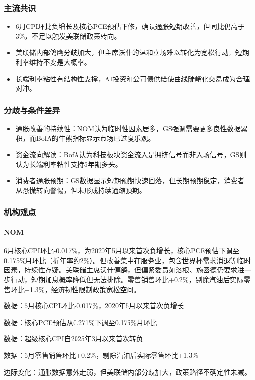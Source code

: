 \documentclass[11pt]{ctexart}
\begin{document}
\subsubsection*{主流共识}
\begin{itemize}
  \item 6月CPI环比负增长及核心PCE预估下修，确认通胀短期改善，但同比仍高于3\%，不足以触发美联储政策转向。
  \item 美联储内部鸽鹰分歧加大，但主席沃什的温和立场难以转化为宽松行动，短期利率维持不变是大概率。
  \item 长端利率粘性有结构性支撑，AI投资和公司债供给使曲线陡峭化交易成为合理对冲。
\end{itemize}
\subsubsection*{分歧与条件差异}
\begin{itemize}
  \item 通胀改善的持续性：NOM认为临时性因素居多，GS强调需要更多良性数据累积，而BofA的牛熊指标显示市场已过度乐观。
  \item 资金流向解读：BofA认为科技板块资金流入是拥挤信号而非入场信号，GS则认为长端利率粘性支持5年期多头。
  \item 消费者通胀预期：GS数据显示短期预期快速回落，但长期预期稳定，消费者从恐慌转向警惕，但未形成持续通缩预期。
\end{itemize}
\subsubsection*{机构观点}
\paragraph{NOM} 6月核心CPI环比-0.017\%，为2020年5月以来首次负增长，核心PCE预估下调至0.175\%月环比（折年率约2\%）。但改善集中在服务业，包含世界杯需求消退等临时因素，持续性存疑。美联储主席沃什偏鸽，但偏紧委员如洛根、施密德仍要求进一步行动，短期加息概率降低但无法排除。零售销售环比+0.2\%，剔除汽油后实际零售环比+1.3\%，经济韧性限制政策宽松空间。
{\small\color{refgray}数据：6月核心CPI环比-0.017\%，2020年5月以来首次负增长\par}
{\small\color{refgray}数据：核心PCE预估从0.271\%下调至0.175\%月环比\par}
{\small\color{refgray}数据：超级核心CPI自2025年3月以来首次转负\par}
{\small\color{refgray}数据：6月零售销售环比+0.2\%，剔除汽油后实际零售环比+1.3\%\par}
{\small\color{refgray}边际变化：通胀数据意外走弱，但美联储内部分歧加大，政策路径不确定性未减。\par}
\end{document}
